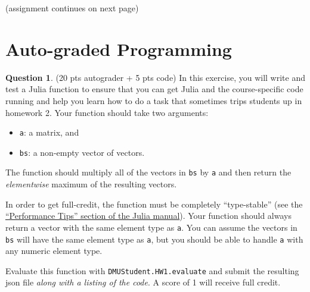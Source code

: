 \documentclass{article}
\theoremstyle{definition}
\newtheorem{question}[thm]{Question}
\begin{document}
(assignment continues on next page)

\pagebreak

\section{Auto-graded Programming}

\begin{question} (20 pts autograder + 5 pts code)
    In this exercise, you will write and test a Julia function to ensure that you can get Julia and the course-specific code running and help you learn how to do a task that sometimes trips students up in homework 2. Your function should take two arguments:
    \begin{itemize}[nosep]
        \item \texttt{a}: a matrix, and
        \item \texttt{bs}: a non-empty vector of vectors.
    \end{itemize}
    The function should multiply all of the vectors in \texttt{bs} by \texttt{a} and then return the \emph{elementwise} maximum of the resulting vectors.

    In order to get full-credit, the function must be completely ``type-stable'' (see the \href{https://docs.julialang.org/en/v1/manual/performance-tips/#Write-%22type-stable%22-functions}{``Performance Tips'' section of the Julia manual}). Your function should always return a vector with the same element type as \texttt{a}. You can assume the vectors in \texttt{bs} will have the same element type as \texttt{a}, but you should be able to handle \texttt{a} with any numeric element type.

    Evaluate this function with \texttt{DMUStudent.HW1.evaluate} and submit the resulting json file \textit{along with a listing of the code}. A score of 1 will receive full credit.
\end{question}
\end{document}
